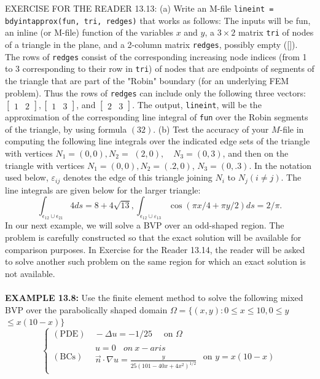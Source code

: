 \documentclass[../main.tex]{subfiles}
\begin{document}
EXERCISE FOR THE READER 13.13: (a) Write an M-file \texttt{lineint = bdyintapprox(fun, tri, redges)} that works as follows: The inputs will be fun, an inline (or M-file) function of the variables $x$ and $y$, a $3 \times 2$ matrix \texttt{tri} of nodes of a triangle in the plane, and a 2-column matrix \texttt{redges}, possibly empty ([]). The rows of \texttt{redges} consist of the corresponding increasing node indices (from 1 to 3 corresponding to their row in \texttt{tri}) of nodes that are endpoints of segments of the triangle that are part of the "Robin" boundary (for an underlying FEM problem). Thus the rows of \texttt{redges} can include only the following three vectors: $\left[\begin{array}{ll}1 & 2\end{array}\right],\left[\begin{array}{ll}1 & 3\end{array}\right]$, and $\left[\begin{array}{ll}2 & 3\end{array}\right]$. The output, \texttt{lineint}, will be the approximation of the corresponding line integral of \texttt{fun} over the Robin segments of the triangle, by using formula $(32)$.
(b) Test the accuracy of your $M$-file in computing the following line integrals over the indicated edge sets of the triangle with vertices $N_{1}=(0,0), N_{2}=$ $(2,0), \quad N_{3}=(0,3)$, and then on the triangle with vertices $N_{1}=(0,0), N_{2}=(.2,0)$, $N_{3}=(0, .3)$. In the notation used below, $\varepsilon_{i j}$ denotes the edge of this triangle joining $N_{i}$ to $N_{j}(i \neq j)$. The line integrals are given below for the larger triangle:
$$\int_{\epsilon_{12} \cup \epsilon_{21}} 4 d s=8+4 \sqrt{13}, \int_{\epsilon_{12} \cup \varepsilon_{13}} \cos (\pi x / 4+\pi y / 2) d s=2 / \pi .
$$
In our next example, we will solve a BVP over an odd-shaped region. The 
problem is carefully constructed so that the exact solution will be available for 
comparison purposes. In Exercise for the Reader 13.14, the reader will be asked to 
solve another such problem on the same region for which an exact solution is not 
available. 
\\
\\
\textbf{EXAMPLE 13.8:} Use the finite element method to solve the following mixed BVP over the parabolically shaped domain $\Omega=\{(x, y): 0 \leq x \leq 10,0 \leq y$ $\leq x(10-x)\}$
$$
\left\{\begin{array}{l}
(\mathrm{PDE}) \quad-\Delta u=-1 / 25 \quad \text { on } \Omega \\
(\mathrm{BCs}) \quad \begin{array}{c}
u=0 ~~~~on~ x-aris\\
\vec{n} \cdot \nabla u=\frac{y}{25\left(101-40 x+4 x^{2}\right)^{1 / 2}}
\end{array} \text { on } y=x(10-x)
\end{array}\right.
$$
\end{document}
